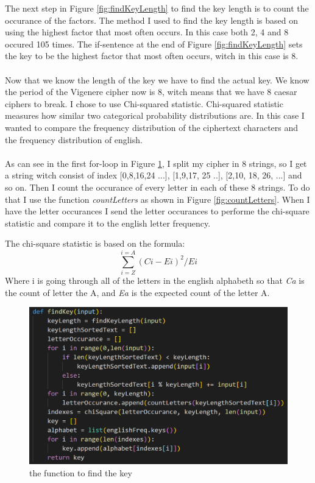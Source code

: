 \documentclass[12pt, letterpaper]{article}
\begin{document}
The next step in Figure \ref{fig:findKeyLength} to find the key length is to count the occurance of the factors. The method I used to find the key length is based on using the highest factor that most often occurs. In this case both 2, 4 and 8 occured 105 times. The if-sentence at the end of Figure \ref{fig:findKeyLength} sets the key to be the highest factor that most often occurs, witch in this case is 8.
\\ \\
Now that we know the length of the key we have to find the actual key. We know the period of the Vigenere cipher now is 8, witch means that we have 8 caesar ciphers to break. I chose to use Chi-squared statistic. Chi-squared statistic measures how similar two categorical probability distributions are. In this case I wanted to compare the frequency distribution of the ciphertext characters and the frequency distribution of english.
\\ \\
As can see in the first for-loop in Figure \ref{fig:findKey}, I split my cipher in 8 strings, so I get a string witch consist of index [0,8,16,24 ...], [1,9,17, 25 ..], [2,10, 18, 26, ...] and so on. Then I count the occurance of every letter in each of these 8 strings. To do that I use the function \textit{countLetters} as shown in Figure \ref{fig:countLetters}. When I have the letter occurances I send the letter occurances to performe the chi-square statistic and compare it to the english letter frequency. 

The chi-square statistic is based on the formula: 
$$\sum_{i = Z}^{i = A} (Ci - Ei)^{2}/Ei $$
Where i is going through all of the letters in the english alphabeth so that \textit{Ca} is the count of letter the A, and \textit{Ea} is the expected count of the letter A.

\begin{figure}
  \includegraphics[width=\linewidth]{code_snippets/findKey.PNG}
  \caption{the function to find the key}
  \label{fig:findKey}
\end{figure}
\end{document}
